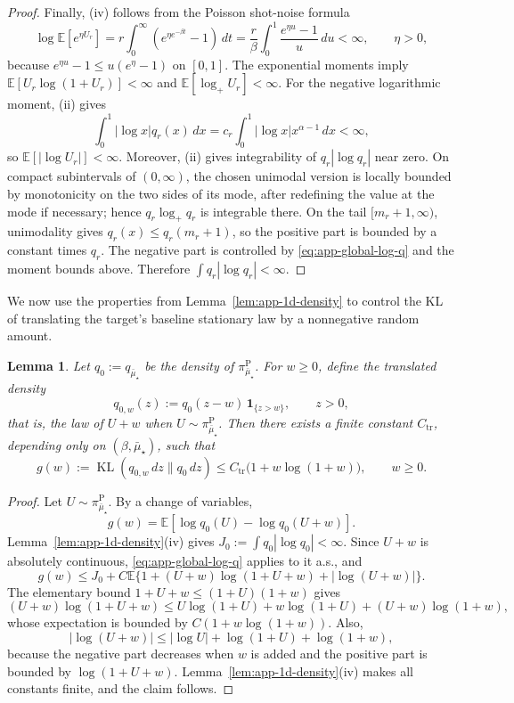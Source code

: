 \documentclass{article}
\newtheorem{lemma}{Lemma}[section]
\newcommand{\KL}{\operatorname{KL}}
\newcommand{\E}{\mathbb{E}}
\begin{document}
\begin{proof}
Finally, (iv) follows from the Poisson shot-noise formula
\[
\log \E[e^{\eta U_r}]
= r\int_0^\infty (e^{\eta e^{-\beta t}}-1)\,dt
= \frac{r}{\beta}\int_0^1\frac{e^{\eta u}-1}{u}\,du<\infty,
\qquad \eta>0,
\]
because $e^{\eta u}-1\le u(e^\eta-1)$ on $[0,1]$. The exponential moments
imply $\E[U_r\log(1+U_r)]<\infty$ and $\E[\log_+ U_r]<\infty$. For the
negative logarithmic moment, (ii) gives
\[
\int_0^1 |\log x|q_r(x)\,dx
= c_r\int_0^1 |\log x|x^{\alpha-1}\,dx<\infty,
\]
so $\E[|\log U_r|]<\infty$.
Moreover, (ii) gives integrability of \(q_r|\log q_r|\) near zero. On compact
subintervals of \((0,\infty)\), the chosen unimodal version is locally bounded
by monotonicity on the two sides of its mode, after redefining the value at the
mode if necessary; hence \(q_r\log_+q_r\) is integrable there. On the tail
\([m_r+1,\infty)\), unimodality gives \(q_r(x)\le q_r(m_r+1)\), so the
positive part is bounded by a constant times \(q_r\). The negative part is
controlled by \eqref{eq:app-global-log-q} and the moment bounds above.
Therefore \(\int q_r|\log q_r|<\infty\).
\end{proof}

We now use the properties from Lemma~\ref{lem:app-1d-density} to control the KL of translating the target's baseline stationary law by a nonnegative random amount.

\begin{lemma}\label{lem:app-translation-kl}
Let $q_0:=q_{\bar\mu_\star}$ be the density of $\pi_{\bar\mu_\star}^{\mathrm P}$.
For $w\ge 0$, define the translated density
\[
q_{0,w}(z):=q_0(z-w)\,\mathbf 1_{\{z>w\}},
\qquad z>0,
\]
that is, the law of $U+w$ when $U\sim \pi_{\bar\mu_\star}^{\mathrm P}$.
Then there exists a finite constant $C_{\mathrm{tr}}$, depending only on
$(\beta,\bar\mu_\star)$, such that
\[
g(w):=\KL(q_{0,w}\,dz\|q_0\,dz)
\le C_{\mathrm{tr}}\bigl(1+w\log(1+w)\bigr),
\qquad w\ge 0.
\]
\end{lemma}

\begin{proof}
Let $U\sim\pi_{\bar\mu_\star}^{\mathrm P}$. By a change of variables,
\[
g(w)=\E[\log q_0(U)-\log q_0(U+w)].
\]
Lemma~\ref{lem:app-1d-density}(iv) gives
$J_0:=\int q_0|\log q_0|<\infty$. Since $U+w$ is absolutely continuous,
\eqref{eq:app-global-log-q} applies to it a.s., and
\[
g(w)\le J_0+C\E\{1+(U+w)\log(1+U+w)+|\log(U+w)|\}.
\]
The elementary bound $1+U+w\le(1+U)(1+w)$ gives
\[
(U+w)\log(1+U+w)
\le U\log(1+U)+w\log(1+U)+(U+w)\log(1+w),
\]
whose expectation is bounded by $C(1+w\log(1+w))$. Also,
\[
|\log(U+w)|\le |\log U|+\log(1+U)+\log(1+w),
\]
because the negative part decreases when $w$ is added and the positive part is
bounded by $\log(1+U+w)$. Lemma~\ref{lem:app-1d-density}(iv) makes all
constants finite, and the claim follows.
\end{proof}
\end{document}
